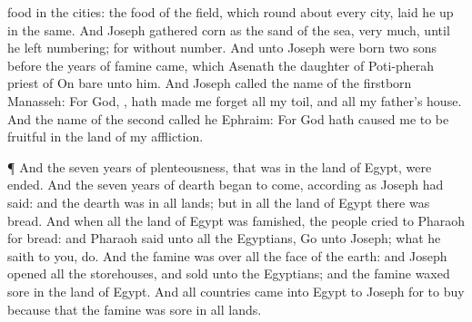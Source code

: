 {food in the
cities: the
food of the
field, which
{} round
about every
city, laid he
up in the
same.
And
Joseph
gathered
corn as the
sand of the
sea,
very
much, until he
left
numbering; for
{}
without
number.
And unto
Joseph were
born
two
sons before the
years of
famine
came, which
Asenath the
daughter of
Poti-pherah
priest of
On
bare unto him.
And
Joseph
called the
name of the
firstborn
Manasseh: For
God,
{}, hath made me
forget all my
toil, and all my
father’s
house.
And the
name of the
second
called he
Ephraim: For
God hath caused me to be
fruitful in the
land of my
affliction.
\par }{\PP {}¶ And the
seven
years of
plenteousness, that was in the
land of
Egypt, were
ended.
And the
seven
years of
dearth
began to
come, according as
Joseph had
said: and the
dearth was in all
lands; but in all the
land of
Egypt there was
bread.
And when all the
land of
Egypt was
famished, the
people
cried to
Pharaoh for
bread: and
Pharaoh
said unto all the
Egyptians,
Go unto
Joseph; what he
saith to you,
do.
And the
famine was over all the
face of the
earth: and
Joseph
opened all the storehouses, and
sold unto the
Egyptians; and the
famine waxed
sore in the
land of
Egypt.
And all
countries
came into
Egypt to
Joseph for to
buy
{} because that the
famine was
{}
sore in all
lands.

}

